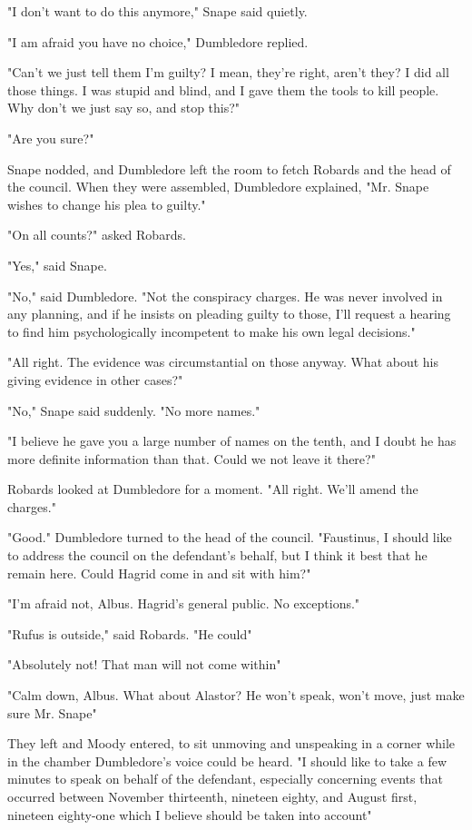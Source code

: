 "I don't want to do this anymore," Snape said quietly.

"I am afraid you have no choice," Dumbledore replied.

"Can't we just tell them I'm guilty? I mean, they're right, aren't they? I did all those things. I was stupid and blind, and I gave them the tools to kill people. Why don't we just say so, and stop this?"

"Are you sure?"

Snape nodded, and Dumbledore left the room to fetch Robards and the head of the council. When they were assembled, Dumbledore explained, "Mr. Snape wishes to change his plea to guilty."

"On all counts?" asked Robards.

"Yes," said Snape.

"No," said Dumbledore. "Not the conspiracy charges. He was never involved in any planning, and if he insists on pleading guilty to those, I'll request a hearing to find him psychologically incompetent to make his own legal decisions."

"All right. The evidence was circumstantial on those anyway. What about his giving evidence in other cases?"

"No," Snape said suddenly. "No more names."

"I believe he gave you a large number of names on the tenth, and I doubt he has more definite information than that. Could we not leave it there?"

Robards looked at Dumbledore for a moment. "All right. We'll amend the charges."

"Good." Dumbledore turned to the head of the council. "Faustinus, I should like to address the council on the defendant's behalf, but I think it best that he remain here. Could Hagrid come in and sit with him?"

"I'm afraid not, Albus. Hagrid's general public. No exceptions."

"Rufus is outside," said Robards. "He could{\el}"

"Absolutely not! That man will not come within{\el}"

"Calm down, Albus. What about Alastor? He won't speak, won't move, just make sure Mr. Snape{\el}"

They left and Moody entered, to sit unmoving and unspeaking in a corner while in the chamber Dumbledore's voice could be heard. "I should like to take a few minutes to speak on behalf of the defendant, especially concerning events that occurred between November thirteenth, nineteen eighty, and August first, nineteen eighty-one which I believe should be taken into account{\el}"

